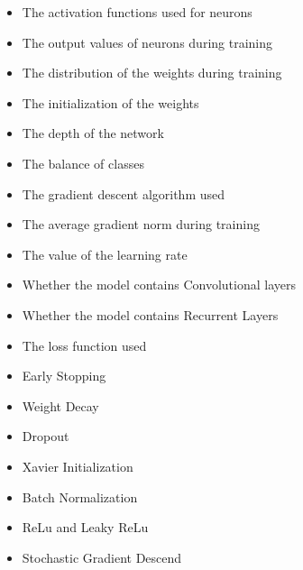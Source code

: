 \begin{box-sol}
    \begin{itemize}[label=]
        \item[\ok] The activation functions used for neurons
        \item The output values of neurons during training
        \item[\ok] The distribution of the weights during training
        \item[\ok] The initialization of the weights
        \item[\ok] The depth of the network
        \item The balance of classes
        \item The gradient descent algorithm used
        \item[\ok] The average gradient norm during training
        \item The value of the learning rate
        \item Whether the model contains Convolutional layers
        \item[\ok] Whether the model contains Recurrent Layers
        \item The loss function used
    \end{itemize}
\end{box-sol}


\begin{box-sol}
    \begin{itemize}[label=]
        \item[\ok] Early Stopping
        \item[\ok] Weight Decay
        \item[\ok] Dropout
        \item Xavier Initialization
        \item[\ok] Batch Normalization
        \item ReLu and Leaky ReLu
        \item Stochastic Gradient Descend
    \end{itemize}
\end{box-sol}


